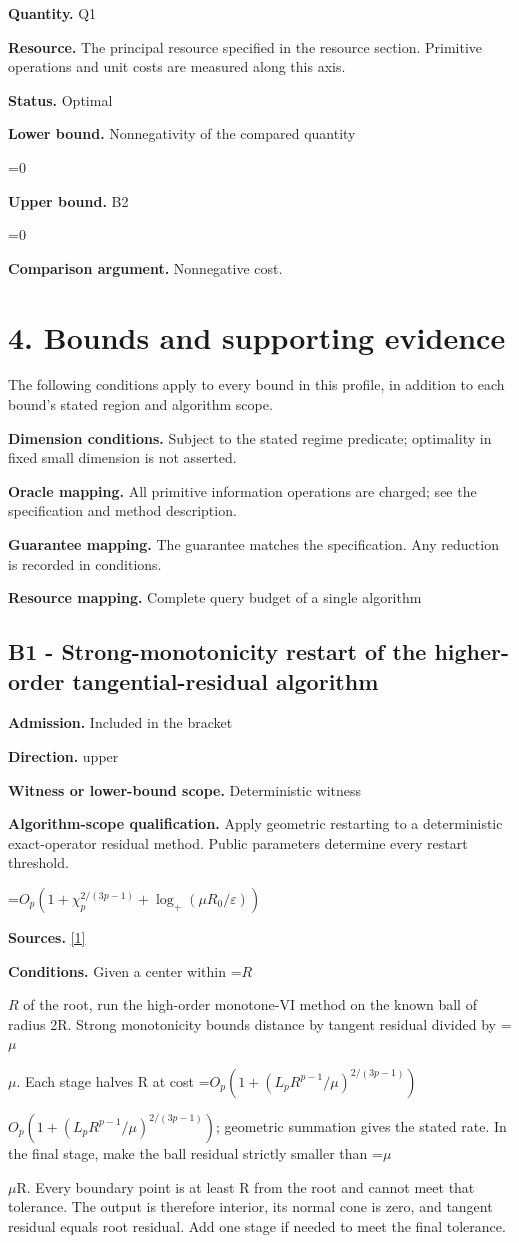 \documentclass[10pt,a4paper]{article}
\newcommand{\AtlasMath}[1]{\par\begingroup\centering\setbox0=\hbox{$\displaystyle #1$}\ifdim\wd0>1.4\linewidth\typeout{ATLAS WIDE FORMULA: \the\wd0}\fi\ifdim\wd0>\linewidth\resizebox{\linewidth}{!}{\box0}\else\box0\fi\par\endgroup}
\newcommand{\AtlasInlineMath}[1]{\begingroup\setbox0=\hbox{$#1$}\ifdim\wd0>.4\linewidth\endgroup\AtlasMath{#1}\else\endgroup$#1$\fi}
\begin{document}
\textbf{Quantity.} Q1

\textbf{Resource.} The principal resource specified in the resource section. Primitive operations and unit costs are measured along this axis.

\textbf{Status.} Optimal

\textbf{Lower bound.} Nonnegativity of the compared quantity

\AtlasMath{0}
\textbf{Upper bound.} B2

\AtlasMath{0}
\textbf{Comparison argument.} Nonnegative cost.

\section{4. Bounds and supporting evidence}
The following conditions apply to every bound in this profile, in addition to each bound's stated region and algorithm scope.

\textbf{Dimension conditions.} Subject to the stated regime predicate; optimality in fixed small dimension is not asserted.

\textbf{Oracle mapping.} All primitive information operations are charged; see the specification and method description.

\textbf{Guarantee mapping.} The guarantee matches the specification. Any reduction is recorded in conditions.

\textbf{Resource mapping.} Complete query budget of a single algorithm

\subsection{B1 - Strong-monotonicity restart of the higher-order tangential-residual algorithm}
\textbf{Admission.} Included in the bracket

\textbf{Direction.} upper

\textbf{Witness or lower-bound scope.} Deterministic witness

\textbf{Algorithm-scope qualification.} Apply geometric restarting to a deterministic exact-operator residual method. Public parameters determine every restart threshold.

\AtlasMath{O_p\!\left(1+\chi_p^{2/(3p-1)}+\log_+(\mu R_0/\varepsilon)\right)}
\textbf{Sources.} \href{https://arxiv.org/pdf/2609.23557v1}{[1]}

\textbf{Conditions.} Given a center within \AtlasInlineMath{R} of the root, run the high-order monotone-VI method on the known ball of radius 2R. Strong monotonicity bounds distance by tangent residual divided by \AtlasInlineMath{\mu}. Each stage halves R at cost \AtlasInlineMath{O_p(1+(L_pR^{p-1}/\mu)^{2/(3p-1)})}; geometric summation gives the stated rate. In the final stage, make the ball residual strictly smaller than \AtlasInlineMath{\mu}R. Every boundary point is at least R from the root and cannot meet that tolerance. The output is therefore interior, its normal cone is zero, and tangent residual equals root residual. Add one stage if needed to meet the final tolerance.
\end{document}
